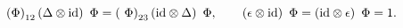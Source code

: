 \begin{equation}\label{llm2.9}
\left( {\Phi }\right) _{12}\left( \Delta \otimes {\rm id}\right) {\ \Phi }%
=\left( {\ \Phi }\right) _{23}\left( {\rm id}\otimes \Delta \right) {\ \Phi }%
,\qquad \left( \epsilon \otimes {\rm id}\right) {\ \Phi }=\left( {\rm id}%
\otimes \epsilon \right) {\ \Phi }=1.  \label{twist-eq}
\end{equation}%
